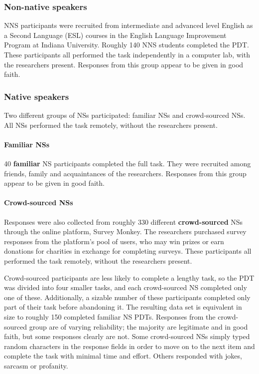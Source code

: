 \documentclass[12pt,notitlepage]{article}
\begin{document}
\subsubsection{Non-native speakers}
NNS participants were recruited from intermediate and advanced level English as a Second Language (ESL) courses in the English Language Improvement Program at Indiana University. Roughly 140 NNS students completed the PDT. These participants all performed the task independently in a computer lab, with the researchers present. Responses from this group appear to be given in good faith.

\subsubsection{Native speakers}
Two different groups of NSs participated: familiar NSs and crowd-sourced NSs. All NSs performed the task remotely, without the researchers present.

\paragraph{Familiar NSs}
40 \textbf{familiar} NS participants completed the full task. They were recruited among friends, family and acquaintances of the researchers. Responses from this group appear to be given in good faith.

\paragraph{Crowd-sourced NSs}
Responses were also collected from roughly 330 different \textbf{crowd-sourced} NSs through the online platform, Survey Monkey. The researchers purchased survey responses from the platform's pool of users, who may win prizes or earn donations for charities in exchange for completing surveys. These participants all performed the task remotely, without the researchers present.

Crowd-sourced participants are less likely to complete a lengthy task, so the PDT was divided into four smaller tasks, and each crowd-sourced NS completed only one of these. Additionally, a sizable number of these participants completed only part of their task before abandoning it. The resulting data set is equivalent in size to roughly 150 completed familiar NS PDTs. Responses from the crowd-sourced group are of varying reliability; the majority are legitimate and in good faith, but some responses clearly are not. Some crowd-sourced NSs simply typed random characters in the response fields in order to move on to the next item and complete the task with minimal time and effort. Others responded with jokes, sarcasm or profanity.
\end{document}
